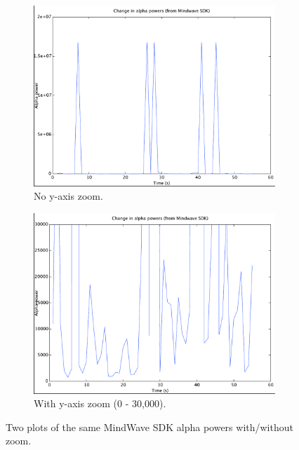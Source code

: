 \documentclass[a4paper,10pt,english,lof,lot,twoside]{puthesis}
\begin{document}
\begin{figure}
\centering
\capstart
\begin{subfigure}[t]{0.48\linewidth}
\centering
\capstart

\includegraphics[width=1.000\linewidth]{mindwave_sdk_low_alpha_power.pdf}
\caption[No y-axis zoom]{No y-axis zoom.}\label{ch-experiment/index:fig-mindwave-sdk-low-alpha-power}\end{subfigure}
\begin{subfigure}[t]{0.48\linewidth}
\centering
\capstart

\includegraphics[width=1.000\linewidth]{mindwave_sdk_low_alpha_power_y_lim_30000.pdf}
\caption[With y-axis zoom (0 - 30,000)]{With y-axis zoom (0 - 30,000).}\label{ch-experiment/index:fig-mindwave-sdk-y-lim-30000}\end{subfigure}
\caption[Two plots of the same MindWave SDK alpha powers with/without zoom]{Two plots of the same MindWave SDK alpha powers with/without zoom.}\label{ch-experiment/index:fig-mindwave-sdk-values}

\end{figure}
\end{document}
